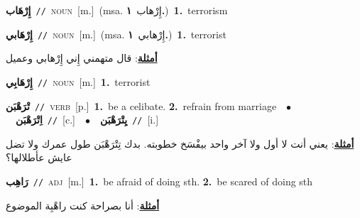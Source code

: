 \documentclass[10pt,a4paper,twoside]{article} %
\begin{document}
\begin{multicols}{2}
{\setlength\topsep{0pt}\textbf{\foreignlanguage{arabic}{إِرْهَاب}}\ {\color{gray}\texttt{//}\color{black}}\ \textsc{noun}\ [m.]\ \color{gray}(msa. \foreignlanguage{arabic}{إِرْهاب}~\foreignlanguage{arabic}{\textbf{١.}})\color{black}\ \textbf{1.}~terrorism\ } \vspace{2mm}

{\setlength\topsep{0pt}\textbf{\foreignlanguage{arabic}{إِرْهَابي}}\ {\color{gray}\texttt{//}\color{black}}\ \textsc{noun}\ [m.]\ \color{gray}(msa. \foreignlanguage{arabic}{إِرْهابي}~\foreignlanguage{arabic}{\textbf{١.}})\color{black}\ \textbf{1.}~terrorist\  \begin{flushright}\color{gray}\foreignlanguage{arabic}{\textbf{\underline{\foreignlanguage{arabic}{أمثلة}}}: قال متهمني إِني إِرْهابي وعميل}\end{flushright}\color{black}} \vspace{2mm}

{\setlength\topsep{0pt}\textbf{\foreignlanguage{arabic}{إِرْهَابِي}}\ {\color{gray}\texttt{//}\color{black}}\ \textsc{noun}\ [m.]\ \textbf{1.}~terrorist\ } \vspace{2mm}

{\setlength\topsep{0pt}\textbf{\foreignlanguage{arabic}{تْرَهْبَن}}\ {\color{gray}\texttt{//}\color{black}}\ \textsc{verb}\ [p.]\ \textbf{1.}~be a celibate.  \textbf{2.}~refrain from marriage\ \ $\bullet$\ \ \setlength\topsep{0pt}\textbf{\foreignlanguage{arabic}{اِتْرَهْبَن}}\ {\color{gray}\texttt{//}\color{black}}\ [c.]\ \ $\bullet$\ \ \setlength\topsep{0pt}\textbf{\foreignlanguage{arabic}{يِتْرَهْبَن}}\ {\color{gray}\texttt{//}\color{black}}\ [i.]\  \begin{flushright}\color{gray}\foreignlanguage{arabic}{\textbf{\underline{\foreignlanguage{arabic}{أمثلة}}}: يعني أنت لا أول ولا آخر واحد بيفْسَخ خطوبته. بدك تِتْرَهْبَن طول عمرك ولا تضل عايش عأطلالها؟}\end{flushright}\color{black}} \vspace{2mm}

{\setlength\topsep{0pt}\textbf{\foreignlanguage{arabic}{رَاهِب}}\ {\color{gray}\texttt{//}\color{black}}\ \textsc{adj}\ [m.]\ \textbf{1.}~be afraid of doing sth.  \textbf{2.}~be scared of doing sth\  \begin{flushright}\color{gray}\foreignlanguage{arabic}{\textbf{\underline{\foreignlanguage{arabic}{أمثلة}}}: أنا بصراحة كنت راهْبِة الموضوع}\end{flushright}\color{black}} \vspace{2mm}


\end{multicols}
\end{document}
